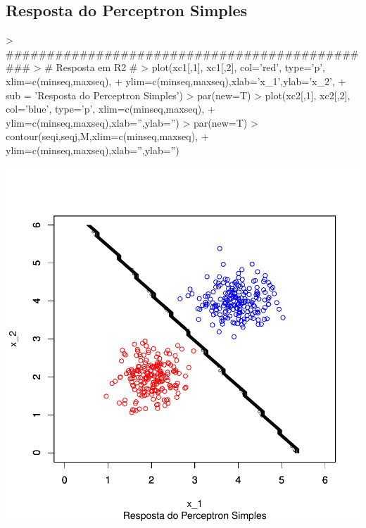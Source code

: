 \documentclass{article}
\begin{document}
\subsection{Resposta do Perceptron Simples}
\begin{Schunk}
\begin{Sinput}
> ##############################################
> # Resposta em R2 #
> plot(xc1[,1], xc1[,2], col='red', type='p', xlim=c(minseq,maxseq), 
+      ylim=c(minseq,maxseq),xlab='x_1',ylab='x_2',
+      sub = 'Resposta do Perceptron Simples')
> par(new=T)
> plot(xc2[,1], xc2[,2], col='blue', type='p', xlim=c(minseq,maxseq), 
+      ylim=c(minseq,maxseq),xlab='',ylab='')
> par(new=T)
> contour(seqi,seqj,M,xlim=c(minseq,maxseq), 
+      ylim=c(minseq,maxseq),xlab='',ylab='')
\end{Sinput}
\end{Schunk}
\includegraphics{perceptron-005}
\end{document}
